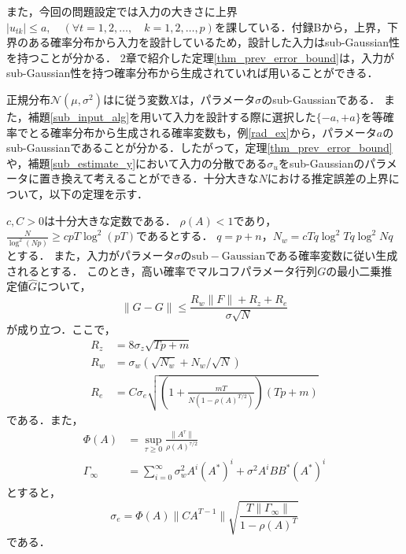 また，今回の問題設定では入力の大きさに上界$|u_{tk}| \leq a,  \quad (\forall t = 1, 2, \ldots,\quad  k = 1, 2, \ldots,p)$を課している．付録Bから，上界，下界のある確率分布から入力を設計しているため，設計した入力はsub-Gaussian性を持つことが分かる．
2章で紹介した定理\ref{thm_prev_error_bound}は，入力がsub-Gaussian性を持つ確率分布から生成されていれば用いることができる．

正規分布$\mathcal{N}(\mu, \sigma^2)$はに従う変数$X$は，パラメータ$\sigma$のsub-Gaussianである．
また，補題\ref{sub_input_alg}を用いて入力を設計する際に選択した$\{-a, +a\}$を等確率でとる確率分布から生成される確率変数も，例\ref{rad_ex}から，パラメータ$a$のsub-Gaussianであることが分かる．したがって，定理\ref{thm_prev_error_bound}や，補題\ref{sub_estimate_y}において入力の分散である$\sigma_u$をsub-Gaussianのパラメータに置き換えて考えることができる．十分大きな$N$における推定誤差の上界について，以下の定理を示す．

\begin{thm}
\label{thm_prev_error_bound_2}
    $c, C >0$は十分大きな定数である．
    $\rho(A) < 1$であり，$\frac{N}{\log^2{(Np)}} \geq cpT\log^2{(pT)}$であるとする．
    $q = p+n$，$N_w = cTq\log^2{Tq}\log^2{Nq}$とする．
    また，入力がパラメータ$\sigma$の$\mathrm{sub-Gaussian}$である確率変数に従い生成されるとする．
    このとき，高い確率でマルコフパラメータ行列$G$の最小二乗推定値$\hat{G}$について，
    \begin{equation*}
        \| \hat{G}-G \| \leq \frac{R_w\|F\| + R_z + R_e}{\sigma\sqrt{N}}
    \end{equation*}
    が成り立つ．ここで，
    \begin{align*}
        R_z &= 8\sigma_z \sqrt{Tp + m} \\
        R_w &= \sigma_w (\sqrt{N_w} + N_w/\sqrt{N}) \\
        R_e &= C\sigma_e \sqrt{ \left( 1+\frac{mT}{N(1-\rho(A)^{T/2})}  \right)(Tp + m) }
    \end{align*}
    である．また，
    \begin{align*}
        \Phi(A) &= \sup_{\tau \geq 0} \frac{\|A^{\tau}\|}{\rho(A)^{\tau/2}} \\
        \Gamma_{\infty} &= \sum_{i = 0}^{\infty} \sigma_w^2A^i(A^*)^i + \sigma^2  A^iBB^*(A^*)^i
    \end{align*}
    とすると，
    \begin{equation*}
        \sigma_e = \Phi(A)\|CA^{T-1}\|\sqrt{\frac{T\|\Gamma_{\infty}\|}{1-\rho(A)^T}}
    \end{equation*}
    である．
\end{thm}